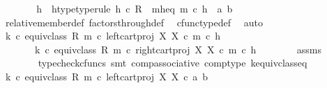 \begin{isabellebody}
\ \ \ \ \isamarkupfalse%
\ \isamarkupfalse%
\ h\ \ h{\isacharunderscore}{\kern0pt}type{\isacharbrackleft}{\kern0pt}type{\isacharunderscore}{\kern0pt}rule{\isacharbrackright}{\kern0pt}{\isacharcolon}{\kern0pt}\ {\isachardoublequoteopen}h\ {\isasymin}\isactrlsub c\ R{\isachardoublequoteclose}\ \ m{\isacharunderscore}{\kern0pt}h{\isacharunderscore}{\kern0pt}eq{\isacharcolon}{\kern0pt}\ {\isachardoublequoteopen}m\ {\isasymcirc}\isactrlsub c\ h\ {\isacharequal}{\kern0pt}\ {\isasymlangle}a{\isacharcomma}{\kern0pt}\ b{\isasymrangle}{\isachardoublequoteclose}\isanewline
\ \ \ \ \ \ \isamarkupfalse%
\ relative{\isacharunderscore}{\kern0pt}member{\isacharunderscore}{\kern0pt}def\ factors{\isacharunderscore}{\kern0pt}through{\isacharunderscore}{\kern0pt}def\ \isamarkupfalse%
\ cfunc{\isacharunderscore}{\kern0pt}type{\isacharunderscore}{\kern0pt}def\ \isamarkupfalse%
\ auto\ \isanewline
\isanewline
\ \ \ \ \isamarkupfalse%
\ {\isachardoublequoteopen}{\isacharparenleft}{\kern0pt}k\ {\isasymcirc}\isactrlsub c\ equiv{\isacharunderscore}{\kern0pt}class\ {\isacharparenleft}{\kern0pt}R{\isacharcomma}{\kern0pt}\ m{\isacharparenright}{\kern0pt}{\isacharparenright}{\kern0pt}\ {\isasymcirc}\isactrlsub c\ left{\isacharunderscore}{\kern0pt}cart{\isacharunderscore}{\kern0pt}proj\ X\ X\ {\isasymcirc}\isactrlsub c\ m\ {\isasymcirc}\isactrlsub c\ h\ {\isacharequal}{\kern0pt}\isanewline
\ \ \ \ \ \ \ {\isacharparenleft}{\kern0pt}k\ {\isasymcirc}\isactrlsub c\ equiv{\isacharunderscore}{\kern0pt}class\ {\isacharparenleft}{\kern0pt}R{\isacharcomma}{\kern0pt}\ m{\isacharparenright}{\kern0pt}{\isacharparenright}{\kern0pt}\ {\isasymcirc}\isactrlsub c\ right{\isacharunderscore}{\kern0pt}cart{\isacharunderscore}{\kern0pt}proj\ X\ X\ {\isasymcirc}\isactrlsub c\ m\ {\isasymcirc}\isactrlsub c\ h{\isachardoublequoteclose}\isanewline
\ \ \ \ \ \ \isamarkupfalse%
\ assms\ \isanewline
\ \ \ \ \ \ \isamarkupfalse%
\ {\isacharparenleft}{\kern0pt}typecheck{\isacharunderscore}{\kern0pt}cfuncs{\isacharcomma}{\kern0pt}\ smt\ comp{\isacharunderscore}{\kern0pt}associative{}\ comp{\isacharunderscore}{\kern0pt}type\ k{\isacharunderscore}{\kern0pt}equiv{\isacharunderscore}{\kern0pt}class{\isacharunderscore}{\kern0pt}eq{\isacharparenright}{\kern0pt}\isanewline
\ \ \ \ \isamarkupfalse%
\ \isamarkupfalse%
\ {\isachardoublequoteopen}{\isacharparenleft}{\kern0pt}k\ {\isasymcirc}\isactrlsub c\ equiv{\isacharunderscore}{\kern0pt}class\ {\isacharparenleft}{\kern0pt}R{\isacharcomma}{\kern0pt}\ m{\isacharparenright}{\kern0pt}{\isacharparenright}{\kern0pt}\ {\isasymcirc}\isactrlsub c\ left{\isacharunderscore}{\kern0pt}cart{\isacharunderscore}{\kern0pt}proj\ X\ X\ {\isasymcirc}\isactrlsub c\ {\isasymlangle}a{\isacharcomma}{\kern0pt}\ b{\isasymrangle}\ {\isacharequal}{\kern0pt}\isanewline

\end{isabellebody}

